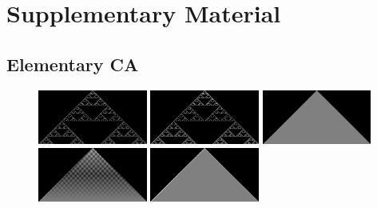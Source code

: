 \documentclass{article}
\begin{document}



\section{Supplementary Material}
\subsection{Elementary CA}

\begin{figure}
    \centering
    \includegraphics[width=0.32\textwidth]{ca-rules/single1/rule-018-090-146-218.png}%
    \hspace{0.01\textwidth}%
    \includegraphics[width=0.32\textwidth]{ca-rules/single1/rule-022.png}\hspace{0.01\textwidth}%
    \includegraphics[width=0.32\textwidth]{ca-rules/single1/rule-050-122-178-250.png}\\
    \vspace{0.01\textwidth}%
    \includegraphics[width=0.32\textwidth]{ca-rules/single1/rule-054.png}\hspace{0.01\textwidth}%
    \includegraphics[width=0.32\textwidth]{ca-rules/single1/rule-094.png}\hspace{0.01\textwidth}%

\end{figure}
\end{document}
